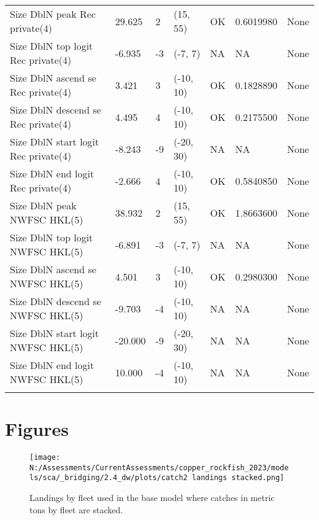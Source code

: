 \documentclass[11pt,
  english,
  letterpaper,
]{article}
\begin{document}
\begin{landscape}
\begin{longtable}[t]{>{\raggedright\arraybackslash}p{7cm}lllll>{\raggedright\arraybackslash}p{4cm}}
Size DblN peak Rec private(4) & 29.625 & 2 & (15, 55) & OK & 0.6019980 & None\\
Size DblN top logit Rec private(4) & -6.935 & -3 & (-7, 7) & NA & NA & None\\
Size DblN ascend se Rec private(4) & 3.421 & 3 & (-10, 10) & OK & 0.1828890 & None\\
Size DblN descend se Rec private(4) & 4.495 & 4 & (-10, 10) & OK & 0.2175500 & None\\
Size DblN start logit Rec private(4) & -8.243 & -9 & (-20, 30) & NA & NA & None\\
Size DblN end logit Rec private(4) & -2.666 & 4 & (-10, 10) & OK & 0.5840850 & None\\
Size DblN peak NWFSC HKL(5) & 38.932 & 2 & (15, 55) & OK & 1.8663600 & None\\
Size DblN top logit NWFSC HKL(5) & -6.891 & -3 & (-7, 7) & NA & NA & None\\
Size DblN ascend se NWFSC HKL(5) & 4.501 & 3 & (-10, 10) & OK & 0.2980300 & None\\
Size DblN descend se NWFSC HKL(5) & -9.703 & -4 & (-10, 10) & NA & NA & None\\
Size DblN start logit NWFSC HKL(5) & -20.000 & -9 & (-20, 30) & NA & NA & None\\
Size DblN end logit NWFSC HKL(5) & 10.000 & -4 & (-10, 10) & NA & NA & None\\*
\end{longtable}
\endgroup{}
\end{landscape}
\endgroup{}







\newpage

\clearpage

\hypertarget{figures}{%
\section{Figures}\label{figures}}

\begin{figure}
\centering
\texttt{[image: N:/Assessments/CurrentAssessments/copper\_rockfish\_2023/models/sca/\_bridging/2.4\_dw/plots/catch2 landings stacked.png]}
\caption{Landings by fleet used in the base model where catches in metric tons by fleet are stacked.\label{fig:catch}}
\end{figure}
\end{document}
